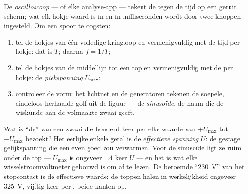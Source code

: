 \begin{method}\label{met:g9:alternating-current:scope}
De \emph{oscilloscoop} --- of elke analyse-app ---
tekent de  tegen de tijd op een geruit scherm; wat elk
hokje waard is in  en in milliseconden wordt door twee
knoppen ingesteld. Om een spoor te oogsten:
\begin{enumerate}
  \item tel de hokjes van één volledige kringloop en vermenigvuldig
        met de tijd per hokje: dat is $T$; daarna $f = 1/T$;
  \item tel de hokjes van de middellijn tot een top en vermenigvuldig
        met de  per hokje: de \emph{piekspanning}
        $U_{\text{max}}$;
  \item controleer de vorm: het lichtnet en de generatoren tekenen de
        soepele, eindeloos herhaalde golf uit de figuur --- de
        \emph{sinusoïde}, de naam die de wiskunde aan de volmaakte
        zwaai geeft.
\end{enumerate}
\end{method}

\begin{proposition}\label{prop:g9:alternating-current:effective}
Wat is ``de''  van een zwaai die honderd keer per
 elke waarde van $+U_{\text{max}}$ tot $-U_{\text{max}}$
bezoekt? Het eerlijke enkele getal is de \emph{effectieve
spanning} $U$: de gestage
gelijkspanning die een  even goed zou
verwarmen. Voor de sinusoïde ligt ze ruim onder de top ---
$U_{\text{max}}$ is ongeveer $1.4$ keer $U$ --- en het is wat elke
wisselstroomvoltmeter gebouwd is om af te lezen. De beroemde
``\qty{230}{V}'' van het stopcontact is de effectieve waarde; de toppen
halen in werkelijkheid ongeveer \qty{325}{V}, vijftig keer per ,
beide kanten op.
\end{proposition}

